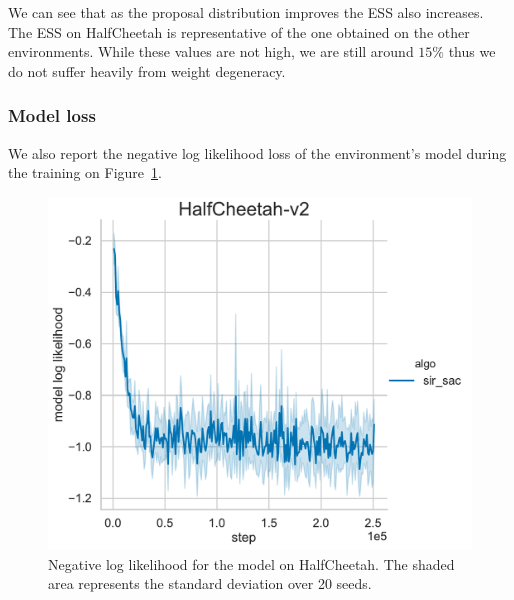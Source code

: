 We can see that as the proposal distribution improves the ESS also increases. The ESS on HalfCheetah is representative of the one obtained on the other environments. 
While these values are not high, we are still around $15 \%$ thus we do not suffer heavily from weight degeneracy. 


\subsubsection{Model loss}
\label{app:model_loss}
We also report the negative log likelihood loss of the environment's model during the training on Figure~\ref{fig:neg_log_lik}.


\begin{figure}[!h]
\centering
\includegraphics[width=0.5\linewidth]{articles/smcp/figures/HalfCheetah-v2_loglik1543284334.pdf}
\caption{Negative log likelihood for the model on HalfCheetah. The shaded area represents the standard deviation over 20 seeds.}
\label{fig:neg_log_lik}
\end{figure}
